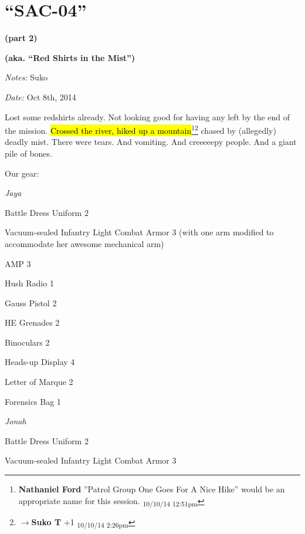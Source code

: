 \setcounter{chapter}{ 33 }
\chapter{\textbf{``SAC-04''} }




\begin{center}
 {\LARGE \textbf{(part 2)} } 
\end{center}


\begin{center}
 {\LARGE \textbf{(aka. ``Red Shirts in the Mist'')} } 
\end{center}




\textit{Notes:} Suko

\textit{Date:} Oct 8th, 2014



Lost some redshirts already.  Not looking good for having any left by the end of the mission. \hl{Crossed the river, hiked up a mountain}\footnote{\textbf{Nathaniel Ford }''Patrol Group One Goes For A Nice Hike'' would be an appropriate name for this session. \textsubscript{10/10/14 12:51pm}}\footnote{$\rightarrow$\textbf{Suko T }+1 \textsubscript{10/10/14 2:26pm}} chased by (allegedly) deadly mist.  There were tears.  And vomiting.  And creeeeepy people.  And a giant pile of bones. 



\noindent\hrulefill





Our gear:



\textit{Jaya}

Battle Dress Uniform 2

Vacuum-sealed Infantry Light Combat Armor 3 (with one arm modified to accommodate her awesome mechanical arm)

AMP 3

Hush Radio 1

Gauss Pistol 2

HE Grenades 2

Binoculars 2

Heads-up Display 4

Letter of Marque 2

Forensics Bag 1



\textit{Jonah}

Battle Dress Uniform 2

Vacuum-sealed Infantry Light Combat Armor 3

